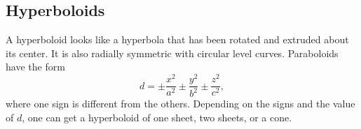 \subsection{Hyperboloids}
\noindent
A hyperboloid looks like a hyperbola that has been rotated and extruded about its center. It is also radially symmetric with circular level curves. Paraboloids have the form 
\begin{equation*}
	d = \pm \frac{x^2}{a^2} \pm \frac{y^2}{b^2} \pm \frac{z^2}{c^2},
\end{equation*}
where one sign is different from the others. Depending on the signs and the value of $d$, one can get a hyperboloid of one sheet, two sheets, or a cone.



